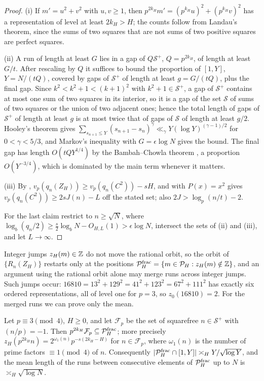 \documentclass[11pt]{article}
\newcommand{\fr}[1]{\{#1\}}
\begin{document}
\begin{proof}
(i) If $m'=u^2+v^2$ with $u,v\ge1$, then $p^{2k_H}m'=(p^{k_H}u)^2+(p^{k_H}v)^2$ has a representation of level at
least $2k_H>H$; the counts follow from Landau's theorem, since the sums of two squares that are not sums of
two positive squares are perfect squares.

(ii) A run of length at least $G$ lies in a gap of $Q\mathcal S^+$, $Q=p^{2k_H}$, of length at least $G/t$. After
rescaling by $Q$ it suffices to bound the proportion of $[1,Y]$, $Y=N/(tQ)$, covered by gaps of $\mathcal S^+$ of
length at least $g=G/(tQ)$, plus the final gap. Since $k^2<k^2+1<(k+1)^2$ with $k^2+1\in\mathcal S^+$, a gap of
$\mathcal S^+$ contains at most one sum of two squares in its interior, so it is a gap of the set $\mathcal S$ of sums
of two squares or the union of two adjacent ones; hence the total length of gaps of $\mathcal S^+$ of length at
least $g$ is at most twice that of gaps of $\mathcal S$ of length at least $g/2$. Hooley's theorem
\cite{Hooley71} gives $\sum_{s_{n+1}\le Y}(s_{n+1}-s_n)^\gamma\ll_\gamma Y(\log Y)^{(\gamma-1)/2}$ for $0<\gamma<5/3$, and
Markov's inequality with $G=\epsilon\log N$ gives the bound. The final gap has length $O(tQY^{1/4})$ by the
Bambah--Chowla theorem \cite{BambahChowla47}, a proportion $O(Y^{-3/4})$, which is dominated by the main
term whenever it matters.

(iii) By , $v_p(q_n(Z_H))\ge v_p(q_n(C^2))-sH$, and  with $P(x)=x^2$
gives $v_p(q_n(C^2))\ge2sJ(n)-L$ off the stated set; also $2J>\log_p(n/t)-2$.

For the last claim restrict to $n\ge\sqrt N$, where $\log_b(q_n/2)\ge\frac s2\log_bN-O_{H,L}(1)>\epsilon\log N$,
intersect the sets of (ii) and (iii), and let $L\to\infty$.
\end{proof}

Integer jumps $z_H(m)\in\mathbb Z$ do not move the rational orbit, so the orbit of $\fr{R_n(Z_H)}$ restarts only at
the positions $\mathcal P_H^{\rm frac}=\{m\in\mathcal P_H:z_H(m)\notin\mathbb Z\}$, and an argument using the rational orbit alone may
merge runs across integer jumps. Such jumps occur: $16810=13^2+129^2=41^2+123^2=67^2+111^2$ has exactly six
ordered representations, all of level one for $p=3$, so $z_0(16810)=2$. For the merged runs we can prove only
the mean.

\begin{proposition}\label{prop:fractional}
Let $p\equiv3\pmod4$, $H\ge0$, and let $\mathcal F_p$ be the set of squarefree $n\in\mathcal S^+$ with $(n/p)=-1$. Then
$p^{2k_H}\mathcal F_p\subseteq\mathcal P_H^{\rm frac}$; more precisely $z_H(p^{2k_H}n)=2^{\omega_1(n)}p^{-s(2k_H-H)}$ for
$n\in\mathcal F_p$, where $\omega_1(n)$ is the number of prime factors $\equiv1\pmod4$ of $n$. Consequently
$|\mathcal P_H^{\rm frac}\cap[1,Y]|\asymp_HY/\sqrt{\log Y}$, and the mean length of the runs between consecutive
elements of $\mathcal P_H^{\rm frac}$ up to $N$ is $\asymp_H\sqrt{\log N}$.
\end{proposition}
\end{document}
